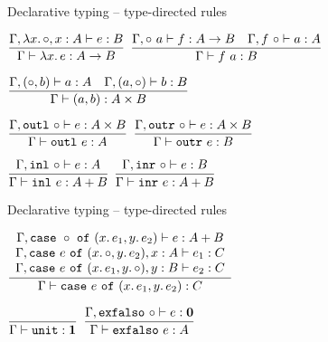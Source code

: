 \documentclass{beamer}
\begin{document}
\begin{frame}{Declarative typing -- type-directed rules}

\begin{center}
  $\infrule{\fulltyping{\extendfun{\Gamma}{x}{A}}{e}{B}}{\typing{\fun{x}{e}}{\Fun{A}{B}}}$ \quad
  $\infrule{\fulltyping{\extendappl{\Gamma}{a}}{f}{\Fun{A}{B}} \quad \fulltyping{\extendappr{\Gamma}{f}}{a}{A}}{\typing{\app{f}{a}}{B}}$

  \vspace{2em}

  $\infrule{\fulltyping{\extendpairl{\Gamma}{b}}{a}{A} \quad \fulltyping{\extendpairr{\Gamma}{a}}{b}{B}}{\typing{\pair{a}{b}}{\Prod{A}{B}}}$

  \vspace{2em}

  $\infrule{\fulltyping{\extendoutl{\Gamma}}{e}{\Prod{A}{B}}}{\typing{\outl{e}}{A}}$ \quad
  $\infrule{\fulltyping{\extendoutr{\Gamma}}{e}{\Prod{A}{B}}}{\typing{\outr{e}}{B}}$

  \vspace{2em}

  $\infrule{\fulltyping{\extendinl{\Gamma}}{e}{A}}{\typing{\inl{e}}{\Sum{A}{B}}}$ \quad
  $\infrule{\fulltyping{\extendinr{\Gamma}}{e}{B}}{\typing{\inr{e}}{\Sum{A}{B}}}$
\end{center}

\end{frame}

\begin{frame}{Declarative typing -- type-directed rules}

\begin{center}
  $\infrule{\begin{array}{c} \fulltyping{\extendcasearg{\Gamma}{x.\, e_1}{y.\, e_2}}{e}{\Sum{A}{B}} \\ \fulltyping{\extendcasel{\Gamma}{e}{x}{A}{y.\, e_2}}{e_1}{C} \\ \fulltyping{\extendcaser{\Gamma}{e}{x.\, e_1}{y}{B}}{e_2}{C} \end{array}}{\typing{\case{e}{x.\, e_1}{y.\, e_2}}{C}}$

  \vspace{2em}

  $\infrule{}{\typing{\unit}{\Unit}}$ \quad
  $\infrule{\fulltyping{\extendexfalso{\Gamma}}{e}{\Empty}}{\typing{\exfalso{e}}{A}}$
\end{center}

\end{frame}
\end{document}
